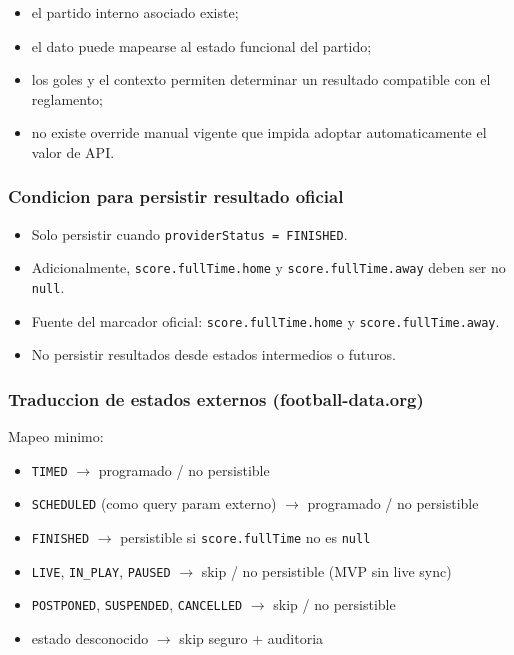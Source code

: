 \begin{itemize}
  \item el partido interno asociado existe;
  \item el dato puede mapearse al estado funcional del partido;
  \item los goles y el contexto permiten determinar un resultado compatible con el reglamento;
  \item no existe override manual vigente que impida adoptar automaticamente el valor de API.
\end{itemize}

\subsubsection{Condicion para persistir resultado oficial}

\begin{itemize}
  \item Solo persistir cuando \texttt{providerStatus = FINISHED}.
  \item Adicionalmente, \texttt{score.fullTime.home} y \texttt{score.fullTime.away} deben ser no \texttt{null}.
  \item Fuente del marcador oficial: \texttt{score.fullTime.home} y \texttt{score.fullTime.away}.
  \item No persistir resultados desde estados intermedios o futuros.
\end{itemize}

\subsubsection{Traduccion de estados externos (football-data.org)}

Mapeo minimo:
\begin{itemize}
  \item \texttt{TIMED} $\rightarrow$ programado / no persistible
  \item \texttt{SCHEDULED} (como query param externo) $\rightarrow$ programado / no persistible
  \item \texttt{FINISHED} $\rightarrow$ persistible si \texttt{score.fullTime} no es \texttt{null}
  \item \texttt{LIVE}, \texttt{IN\_PLAY}, \texttt{PAUSED} $\rightarrow$ skip / no persistible (MVP sin live sync)
  \item \texttt{POSTPONED}, \texttt{SUSPENDED}, \texttt{CANCELLED} $\rightarrow$ skip / no persistible
  \item estado desconocido $\rightarrow$ skip seguro + auditoria
\end{itemize}

